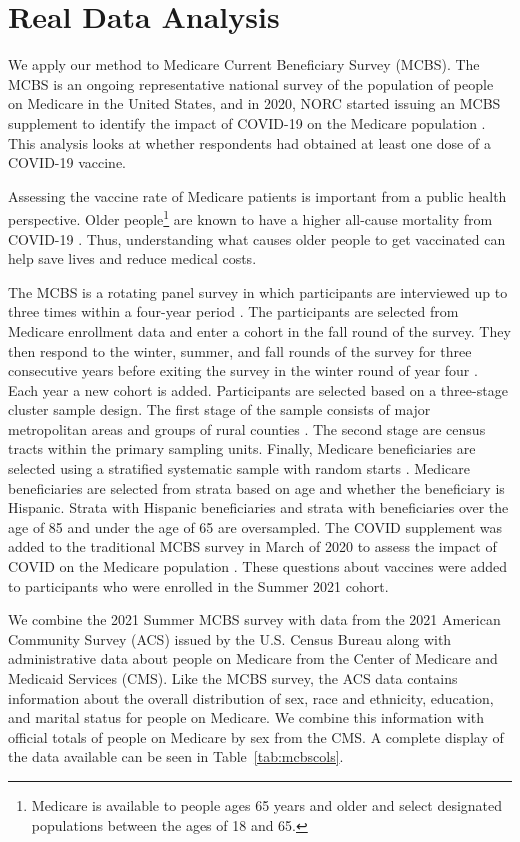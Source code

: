 \documentclass[12pt]{article}
\begin{document}
\section{Real Data Analysis}

We apply our method to Medicare Current Beneficiary Survey (MCBS). The MCBS
is an ongoing representative national survey of the population of people on
Medicare in the United States, and in 2020, NORC started issuing an MCBS
supplement to identify the impact of COVID-19 on the Medicare population
\citep{norc2020mcbs}. This analysis looks at whether
respondents had obtained at least one dose of a COVID-19 vaccine.

Assessing the vaccine rate of Medicare patients is important from a public
health perspective. Older people\footnote{Medicare is available to people ages
65 years and older and select designated populations between the ages of 18 and
65.}
are known to have a higher all-cause mortality from
COVID-19 \citep{bonanad2020effect}. Thus, understanding what causes older people
to get vaccinated can help save lives and reduce medical costs.

The MCBS is a rotating panel survey in which participants are interviewed up to
three times within a four-year period \citep{cms2021mcbs}. The participants
are selected from Medicare enrollment data and enter a cohort in the fall round
of the survey. They then respond to the winter, summer,
and fall rounds of the survey for three consecutive years before exiting the
survey in the winter round of year four \citep{cms2021mcbs}. Each year a new
cohort is added. Participants are selected based on a three-stage cluster sample
design. The first stage of the sample consists of major metropolitan areas and
groups of rural counties \citep{cms2021mcbs}. The second stage are census
tracts within the primary sampling units. Finally, Medicare beneficiaries are
selected using a stratified systematic sample with random starts 
\citep{cms2021mcbs}. Medicare beneficiaries are selected from strata based on
age and whether the beneficiary is Hispanic. Strata with Hispanic beneficiaries
and strata with beneficiaries over the age of 85 and under the age of 65 are
oversampled.
The COVID supplement was added to the traditional MCBS survey in March of
2020 to assess the impact of COVID on the Medicare
population \citep{cms2021covid}. These questions about vaccines were added to
participants who were enrolled in the Summer 2021 cohort.

We combine the 2021 Summer MCBS survey with data from the 2021 American
Community Survey (ACS)
issued by the U.S. Census Bureau along with administrative data about people on
Medicare from the Center of Medicare and Medicaid Services (CMS). Like the MCBS
survey, the ACS data contains information about the overall distribution of
sex, race and ethnicity, education, and marital status for people on
Medicare. We combine this information with official totals of people on Medicare
by sex from the CMS. A complete display of the data available can be seen in
Table~\ref{tab:mcbscols}.
\end{document}
